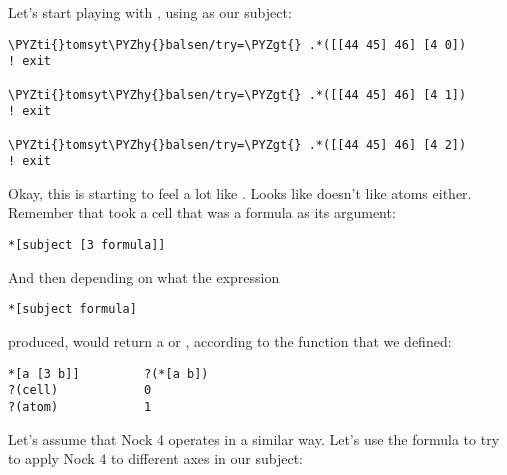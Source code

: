 Let's start playing with , using \kode{[[44 45] 46]} as our subject:
\begin{framed_shaded}
\begin{Verbatim}[fontsize=\relsize{-2.5},commandchars=\\\{\}]
\PYZti{}tomsyt\PYZhy{}balsen/try=\PYZgt{} .*([[44 45] 46] [4 0])
! exit

\PYZti{}tomsyt\PYZhy{}balsen/try=\PYZgt{} .*([[44 45] 46] [4 1])
! exit

\PYZti{}tomsyt\PYZhy{}balsen/try=\PYZgt{} .*([[44 45] 46] [4 2])
! exit
\end{Verbatim}
\end{framed_shaded}
Okay, this is starting to feel a lot like . Looks like  doesn't
like atoms either. Remember that  took a cell that was a formula as its
argument:
\begin{framed_shaded}
\begin{Verbatim}[fontsize=\relsize{-2.5},commandchars=\\\{\}]
*[subject [3 formula]]
\end{Verbatim}
\end{framed_shaded}
And then depending on what the expression
\begin{framed_shaded}
\begin{Verbatim}[fontsize=\relsize{-2.5},commandchars=\\\{\}]
*[subject formula]
\end{Verbatim}
\end{framed_shaded}
produced,  would return a  or , according to the function 
that we defined:
\begin{framed_shaded}
\begin{Verbatim}[fontsize=\relsize{-2.5},commandchars=\\\{\}]
*[a [3 b]]         ?(*[a b])
?(cell)            0
?(atom)            1
\end{Verbatim}
\end{framed_shaded}
Let's assume that Nock 4 operates in a similar way. Let's use the formula \kode{[0
n]} to try to apply Nock 4 to different axes in our subject:


